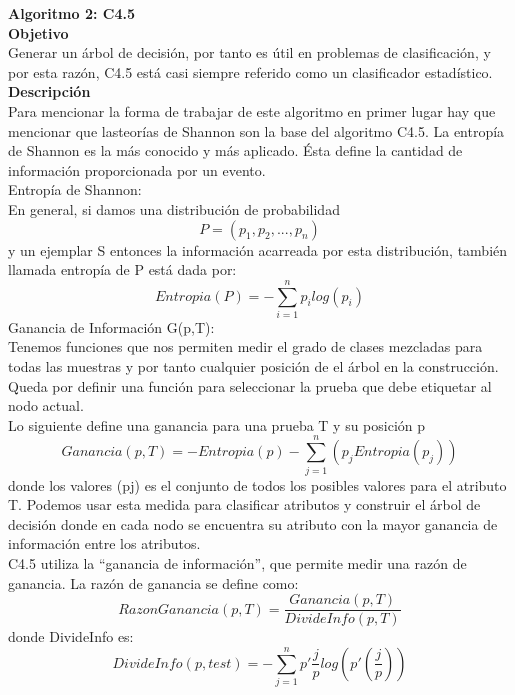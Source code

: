 \documentclass{article}
\begin{document}
{\bf Algoritmo 2: C4.5}\\
{\bf Objetivo}\\
Generar un árbol de decisión, por tanto es útil en problemas de clasificación, y por esta razón, C4.5 está casi siempre referido como un clasificador estadístico.\\
 {\bf Descripción}\\
 Para mencionar la forma de trabajar de este algoritmo en primer lugar hay que mencionar que lasteorías de Shannon son la base del algoritmo C4.5. La entropía de Shannon es la más conocido y más aplicado. Ésta define la cantidad de información proporcionada por un evento.\\

Entropía de Shannon:\\
En general, si damos una distribución de probabilidad \[P = (p_1, p_2,..., p_n)\] y un ejemplar S entonces la información acarreada por esta distribución, también llamada entropía de P está dada por:\\
 \begin{equation*}
 Entropia(P) = -\sum_{i=1}^{n}p_ilog(p_i)
 \end{equation*}
Ganancia de Información G(p,T):\\
Tenemos funciones que nos permiten medir el grado de clases mezcladas para todas las muestras y por tanto cualquier posición de el árbol en la construcción. Queda por definir una función para seleccionar la prueba que debe etiquetar al nodo actual.\\
Lo siguiente define una ganancia para una prueba T y su posición p
 \begin{equation*}
 Ganancia(p,T) = -Entropia(p) - \sum_{j=1}^{n}(p_jEntropia(p_j))
 \end{equation*}
donde los valores (pj) es el conjunto de todos los posibles valores para el atributo T. 
Podemos usar esta medida para clasificar atributos y construir el árbol de decisión donde en cada nodo se encuentra su atributo con la mayor ganancia de información entre los atributos.\\
C4.5 utiliza la “ganancia de información”, que permite medir una razón de ganancia.
 La razón de ganancia se define como:\\
 $$ RazonGanancia(p,T) = \frac{Ganancia(p,T)}{DivideInfo(p,T)} $$
 donde DivideInfo es:\\
 \begin{equation*}
 DivideInfo(p,test) = - \sum_{j=1}^{n}p'\frac{j}{p}log(p'(\frac{j}{p}))
 \end{equation*}
\end{document}
